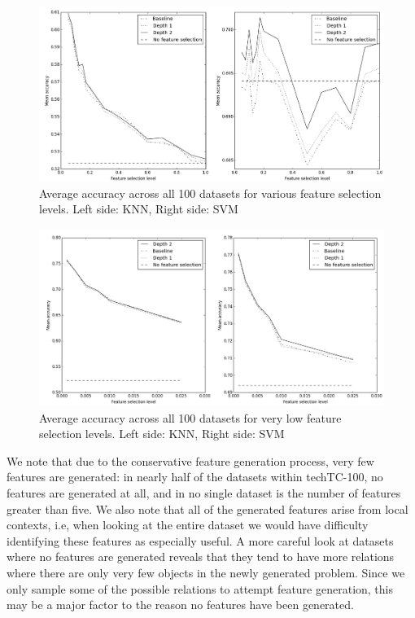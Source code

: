 \documentclass{article}
\theoremstyle{definition}
\begin{document}
\begin{figure}[H]
	\centering
	\includegraphics[width=\linewidth]{accuracy.png}
	\caption{Average accuracy across all 100 datasets for various feature selection levels. Left side: KNN, Right side: SVM}
	\label{fig:accuracy}
\end{figure}

\begin{figure}[H]
	\centering
	\includegraphics[width=\linewidth]{accuracy_low.png}
	\caption{Average accuracy across all 100 datasets for very low feature selection levels. Left side: KNN, Right side: SVM}
	\label{fig:accuracy_low}
\end{figure}

We note that due to the conservative feature generation process, very few features are generated: in nearly half of the datasets within techTC-100, no features are generated at all, and in no single dataset is the number of features greater than five. We also note that all of the generated features arise from local contexts, i.e, when looking at the entire dataset we would have difficulty identifying these features as especially useful. A more careful look at datasets where no features are generated reveals that they tend to have more relations where there are only very few objects in the newly generated problem. Since we only sample some of the possible relations to attempt feature generation, this may be a major factor to the reason no features have been generated.
\end{document}
